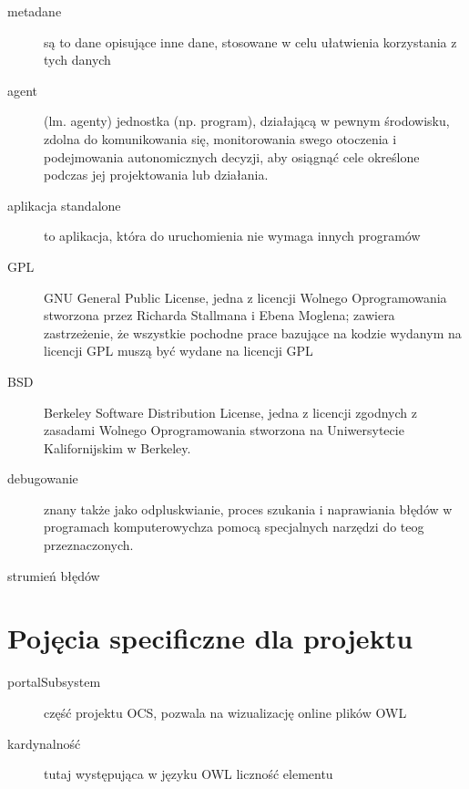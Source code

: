 \documentclass[a4paper,10pt]{article}
\begin{document}
\begin{description}
	\item[metadane] są to dane opisujące inne dane, stosowane w celu ułatwienia korzystania z tych danych
	\item[agent] (lm. agenty) jednostka (np. program), działającą w pewnym środowisku, zdolna do komunikowania się, monitorowania swego otoczenia i podejmowania autonomicznych decyzji, aby osiągnąć cele określone podczas jej projektowania lub działania.
	\item[aplikacja standalone] to aplikacja, która do uruchomienia nie wymaga innych programów
	\item[GPL] GNU General Public License, jedna z licencji Wolnego Oprogramowania stworzona przez Richarda Stallmana i Ebena Moglena; zawiera zastrzeżenie, że wszystkie pochodne prace bazujące na kodzie wydanym na licencji GPL muszą być wydane na licencji GPL 
	\item[BSD] Berkeley Software Distribution License, jedna z licencji zgodnych z zasadami Wolnego Oprogramowania stworzona na Uniwersytecie Kalifornijskim w Berkeley.
	\item[debugowanie] znany także jako odpluskwianie, proces szukania i naprawiania błędów	w programach komputerowychza pomocą specjalnych narzędzi do teog przeznaczonych.
	\item[strumień błędów]
\end{description}



\section{Pojęcia specificzne dla projektu}
\begin{description}
 	\item[portalSubsystem] część projektu OCS, pozwala na wizualizację online plików OWL
 	\item[kardynalność] tutaj występująca w języku OWL liczność elementu 
\end{description}



\clearpage
{}
{}
%
\end{document}
